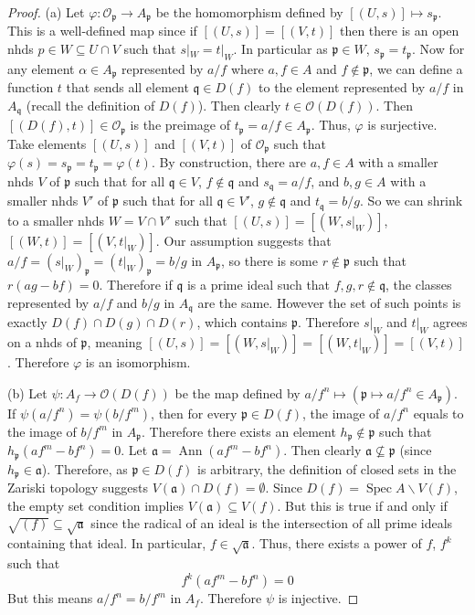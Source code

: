 \documentclass[12pt]{article}
\theoremstyle{remark}
\newcommand{\Spec}[0]{\operatorname{Spec}}
\begin{document}
	\begin{proof}
	(a) Let $\varphi:\mathscr O_{\mathfrak p}\to A_{\mathfrak p}$ be the homomorphism defined by $[(U, s)]\mapsto s_{\mathfrak p}$. This is a well-defined map since if $[(U, s)]=[(V, t)]$ then there is an open nhds $p\in W\subseteq U\cap V$ such that $s|_W=t|_W$. In particular as $\mathfrak p \in W$, $s_{\mathfrak p}=t_{\mathfrak p}$. Now for any element $\alpha\in A_{\mathfrak p}$ represented by $a/f$ where $a, f\in A$ and $f\notin \mathfrak p$, we can define a function $t$ that sends all element $\mathfrak q\in D(f)$ to the element represented by $a/f$ in $A_{\mathfrak q}$ (recall the definition of $D(f)$). Then clearly $t\in\mathscr O(D(f))$. Then $[(D(f), t)]\in \mathscr O_{\mathfrak p}$ is the preimage of $t_{\mathfrak p}=a/f\in A_{\mathfrak p}$. Thus, $\varphi$ is surjective. Take elements $[(U, s)]$ and $[(V, t)]$ of $\mathscr O_{\mathfrak p}$ such that $\varphi(s)=s_{\mathfrak p}=t_{\mathfrak p}=\varphi(t)$. By construction, there are $a, f\in A$ with a smaller nhds $V$ of $\mathfrak p$ such that for all $\mathfrak q\in V$, $f\notin \mathfrak q$ and $s_{\mathfrak q}=a/f$, and $b, g\in A$ with a smaller nhds $V'$ of $\mathfrak p$ such that for all $\mathfrak q\in V'$, $g\notin \mathfrak q$ and $t_{\mathfrak q}=b/g$. So we can shrink to a smaller nhds $W=V\cap V'$ such that $[(U, s)]=[(W, s|_W)]$, $[(W, t)]=[(V, t|_W)]$. Our assumption suggests that $a/f=(s|_W)_{\mathfrak p}=(t|_{W})_{\mathfrak p}=b/g$ in $A_{\mathfrak p}$, so there is some $r\notin \mathfrak p$ such that $r(ag-bf)=0$. Therefore if $\mathfrak q$ is a prime ideal such that $f, g, r\notin \mathfrak q$, the classes represented by $a/f$ and $b/g$ in $A_{\mathfrak q}$ are the same. However the set of such points is exactly $D(f)\cap D(g)\cap D(r)$, which contains $\mathfrak p$. Therefore $s|_W$ and $t|_W$ agrees on a nhds of $\mathfrak p$, meaning $[(U, s)]=[(W, s|_W)]=[(W, t|_W)]=[(V, t)]$. Therefore $\varphi$ is an isomorphism.
	
	(b) Let $\psi: A_f\to \mathscr O(D(f))$ be the map defined by $a/f^n\mapsto (\mathfrak p\mapsto a/f^n\in A_{\mathfrak p})$. If $\psi(a/f^n)=\psi(b/f^m)$, then for every $\mathfrak p\in D(f)$, the image of $a/f^n$ equals to the image of $b/f^m$ in $A_{\mathfrak p}$. Therefore there exists an element $h_{\mathfrak p}\notin \mathfrak p$ such that $h_{\mathfrak p}(af^m-bf^n)=0$. Let $\mathfrak a=\operatorname{Ann}(af^m-bf^n)$. Then clearly $\mathfrak a\not\subseteq \mathfrak p$ (since $h_{\mathfrak p}\in \mathfrak a$). Therefore, as $\mathfrak p\in D(f)$ is arbitrary, the definition of closed sets in the Zariski topology suggests $V(\mathfrak a)\cap D(f)=\emptyset$. Since $D(f)=\Spec A\backslash V(f)$, the empty set condition implies $V(\mathfrak a)\subseteq V(f)$. But this is true if and only if $\sqrt{(f)}\subseteq \sqrt{\mathfrak a}$ since the radical of an ideal is the intersection of all prime ideals containing that ideal. In particular, $f\in\sqrt{\mathfrak a}$. Thus, there exists a power of $f$, $f^k$ such that
	\[f^k(af^m-bf^n)=0\]
	But this means $a/f^n=b/f^m$ in $A_f$. Therefore $\psi$ is injective.
	

\end{proof}
\end{document}
